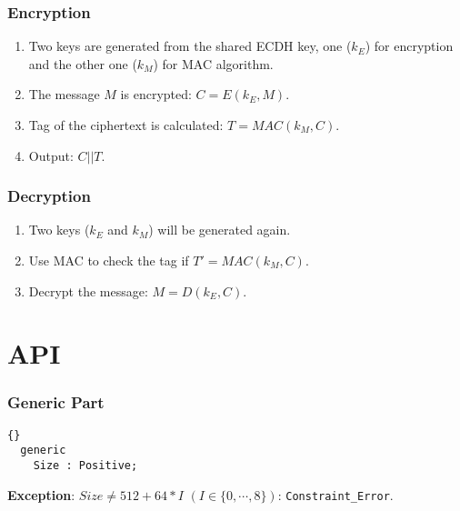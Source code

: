 \subsubsection*{Encryption}
\begin{enumerate}
\item Two keys are generated from the shared ECDH key, one ($k_E$) for
  encryption and the other one ($k_M$) for MAC algorithm.
\item The message $M$ is encrypted: $C=E({k_E},M)$.
\item Tag of the ciphertext is calculated: $T=MAC({k_M},C)$.
\item Output: $C||T$.
\end{enumerate}
\subsubsection*{Decryption}
\begin{enumerate}
\item Two keys ($k_E$ and $k_M$) will be generated again.
\item Use MAC to check the tag if $T'=MAC({k_M},C)$.
\item Decrypt the message: $M=D({k_E},C)$.
\end{enumerate}

\section{API}
\subsubsection*{Generic Part}
\begin{lstlisting}{}
  generic
    Size : Positive;
\end{lstlisting}
\textbf{Exception}: $Size\neq 512+64*I$ $(I\in \{0,\cdots,8\})$:
\texttt{Constraint\_Error}.
